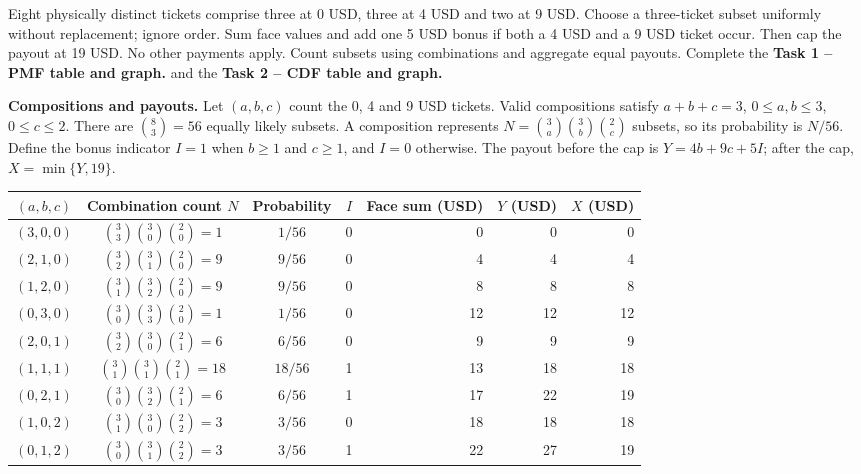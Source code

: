   Eight physically distinct tickets comprise three at 0 USD, three at 4 USD
  and two at 9 USD. Choose a three-ticket subset uniformly without replacement;
  ignore order. Sum face values and add one 5 USD bonus if both a 4 USD and
  a 9 USD ticket occur. Then cap the payout at 19 USD. No other payments apply.
  Count subsets using combinations and aggregate equal payouts. Complete the \textbf{Task 1 -- PMF table and graph.} and the \textbf{Task 2 -- CDF table and graph.}

  \textbf{Compositions and payouts.} Let $(a,b,c)$ count the 0, 4 and 9 USD tickets.
  Valid compositions satisfy $a+b+c=3$, $0\leq a,b\leq3$, $0\leq c\leq2$.
  There are $\binom83=56$ equally likely subsets. A composition represents
  $N=\binom3a\binom3b\binom2c$ subsets, so its probability is $N/56$.
  Define the bonus indicator $I=1$ when $b\geq1$ and $c\geq1$, and $I=0$ otherwise.
  The payout before the cap is $Y=4b+9c+5I$; after the cap, $X=\min\{Y,19\}$.
  \begin{center}
    \begin{tabular}{@{}ccccrrr@{}}\toprule
      $(a,b,c)$ & Combination count $N$ & Probability & $I$ & Face sum (USD) & $Y$ (USD) & $X$ (USD) \\\midrule
      $(3,0,0)$ & $\binom33\binom30\binom20=1$ & $1/56$ & 0 & 0 & 0 & 0 \\
      $(2,1,0)$ & $\binom32\binom31\binom20=9$ & $9/56$ & 0 & 4 & 4 & 4 \\
      $(1,2,0)$ & $\binom31\binom32\binom20=9$ & $9/56$ & 0 & 8 & 8 & 8 \\
      $(0,3,0)$ & $\binom30\binom33\binom20=1$ & $1/56$ & 0 & 12 & 12 & 12 \\
      $(2,0,1)$ & $\binom32\binom30\binom21=6$ & $6/56$ & 0 & 9 & 9 & 9 \\
      $(1,1,1)$ & $\binom31\binom31\binom21=18$ & $18/56$ & 1 & 13 & 18 & 18 \\
      $(0,2,1)$ & $\binom30\binom32\binom21=6$ & $6/56$ & 1 & 17 & 22 & 19 \\
      $(1,0,2)$ & $\binom31\binom30\binom22=3$ & $3/56$ & 0 & 18 & 18 & 18 \\
      $(0,1,2)$ & $\binom30\binom31\binom22=3$ & $3/56$ & 1 & 22 & 27 & 19 \\\bottomrule
    \end{tabular}
  \end{center}
